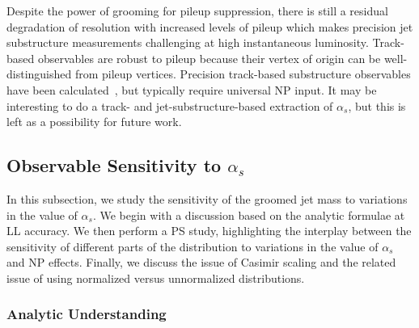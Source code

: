 \documentclass[11pt]{cernrep}
\begin{document}
Despite the power of grooming for pileup suppression, there is still a residual degradation of resolution with increased levels of pileup which makes precision jet substructure measurements challenging at high instantaneous luminosity.
%
Track-based observables are robust to pileup because their vertex of origin can be well-distinguished from pileup vertices.
%
Precision track-based substructure observables have been calculated~\cite{Krohn:2012fg,Waalewijn:2012sv,Chang:2013rca,Elder:2017bkd}, but typically require universal NP input.
%
It may be interesting to do a track- and jet-substructure-based extraction of $\alpha_s$, but this is left as a possibility for future work.

\subsection{Observable Sensitivity to $\alpha_s$}
\label{jetsub_alphas_sec:jetmass}

In this subsection, we study the sensitivity of the groomed jet mass to variations in the value of $\alpha_s$.
%
We begin with a discussion based on the analytic formulae at LL accuracy.
%
We then perform a PS study, highlighting the interplay between the sensitivity of different parts of the distribution to variations in the value of $\alpha_s$ and NP effects.
%
Finally, we discuss the issue of Casimir scaling and the related issue of using normalized versus unnormalized distributions.


\subsubsection{Analytic Understanding}
\label{jetsub_alphas_sec:analytic}
\end{document}
